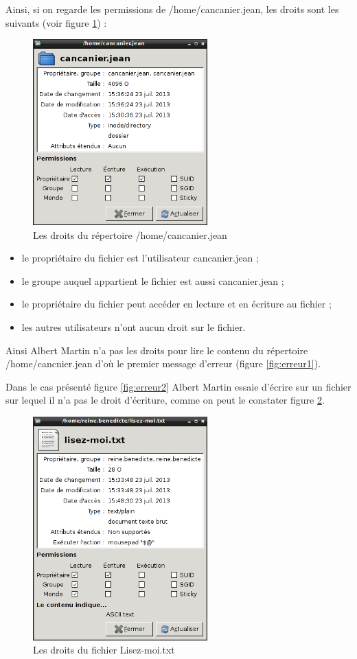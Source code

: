 Ainsi, si on regarde les permissions de /home/cancanier.jean, les droits sont les suivants (voir figure \ref{fig:droit1}) :
\begin{figure}[ht]
  \centering
 \includegraphics[width=0.6\textwidth]{droit1}
  \caption{\footnotesize{Les droits du répertoire /home/cancanier.jean}}
  \label{fig:droit1}  
\end{figure}
\begin{itemize}
\item le propriétaire du fichier est l'utilisateur cancanier.jean ;
\item le groupe auquel appartient le fichier est aussi cancanier.jean ;
\item le propriétaire du fichier peut accéder en lecture et en écriture au fichier ;
\item les autres utilisateurs n'ont aucun droit sur le fichier. 
\end{itemize}
Ainsi Albert Martin n'a pas les droits pour lire le contenu du répertoire /home/cancnier.jean d'où le premier message d'erreur (figure \ref{fig:erreur1}). \par
Dans le cas présenté figure \ref{fig:erreur2} Albert Martin essaie d'écrire sur un fichier sur lequel il n'a pas le droit d'écriture, comme on peut le constater figure \ref{fig:droit2}.
\begin{figure}[ht]
  \centering
  \includegraphics[width=0.6\textwidth]{droit2}
  \caption{\footnotesize{Les droits du fichier Lisez-moi.txt}}
  \label{fig:droit2}
\end{figure}
